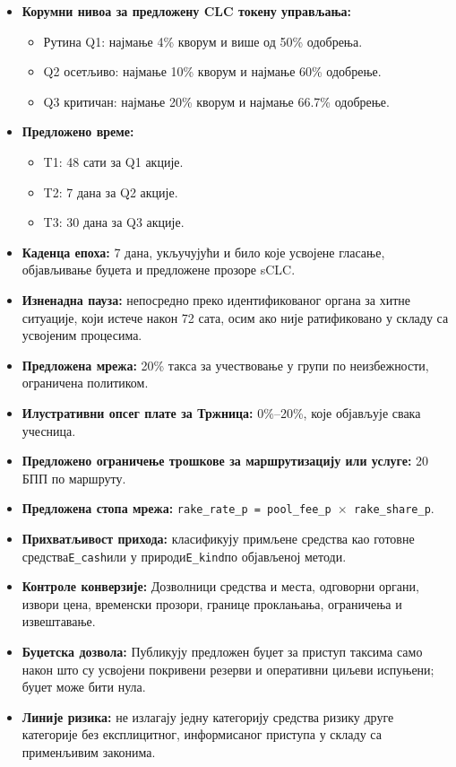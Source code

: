 \documentclass[11pt]{article}
\begin{document}
\begin{itemize}[leftmargin=*]
\item \textbf{Корумни нивоа за предложену CLC токену управљања:}
\begin{itemize}[leftmargin=*]
\item Рутина Q1: најмање 4\% кворум и више од 50\% одобрења.
\item Q2 осетљиво: најмање 10\% кворум и најмање 60\% одобрење.
\item Q3 критичан: најмање 20\% кворум и најмање 66.7\% одобрење.
\end{itemize}
\item \textbf{Предложено време:}
\begin{itemize}[leftmargin=*]
\item T1: 48 сати за Q1 акције.
\item T2: 7 дана за Q2 акције.
\item T3: 30 дана за Q3 акције.
\end{itemize}
\item \textbf{Каденца епоха:} 7 дана, укључујући и било које усвојене гласање, објављивање буџета и предложене прозоре sCLC.
\item \textbf{Изненадна пауза:} непосредно преко идентификованог органа за хитне ситуације, који истече након 72 сата, осим ако није ратификовано у складу са усвојеним процесима.
\item \textbf{Предложена мрежа:} 20\% такса за учествовање у групи по неизбежности, ограничена политиком.
\item \textbf{Илустративни опсег плате за Тржница:} 0\%--20\%, које објављује свака учесница.
\item \textbf{Предложено ограничење трошкове за маршрутизацију или услуге:} 20 БПП по маршруту.
\item \textbf{Предложена стопа мрежа:} \texttt{rake\_rate\_p = pool\_fee\_p $\times$ rake\_share\_p}.
\item \textbf{Прихватљивост прихода:} класификују примљене средства као готовне средства\texttt{E\_cash}или у природи\texttt{E\_kind}по објављеној методи.
\item \textbf{Контроле конверзије:} Дозволници средства и места, одговорни органи, извори цена, временски прозори, границе проклањања, ограничења и извештавање.
\item \textbf{Буџетска дозвола:} Публикују предложен буџет за приступ таксима само након што су усвојени покривени резерви и оперативни циљеви испуњени; буџет може бити нула.
\item \textbf{Линије ризика:} не излагају једну категорију средства ризику друге категорије без експлицитног, информисаног приступа у складу са применљивим законима.

\end{itemize}
\end{document}
